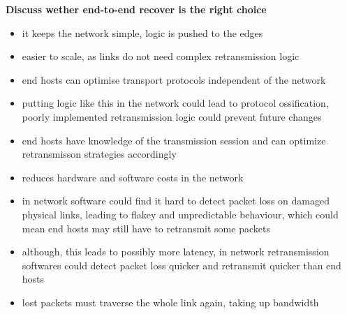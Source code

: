 \documentclass{article}
\begin{document}
\textbf{Discuss wether end-to-end recover is the right choice}
\begin{itemize}
    \item it keeps the network simple, logic is pushed to the edges
    \item easier to scale, as links do not need complex retransmission logic
    \item end hosts can optimise transport protocols independent of the network
    \item putting logic like this in the network could lead to protocol ossification, poorly implemented retransmission logic could prevent future changes
    \item end hosts have knowledge of the transmission session and can optimize retransmisson strategies accordingly
    \item reduces hardware and software costs in the network
    \item in network software could find it hard to detect packet loss on damaged physical links, leading to flakey and unpredictable behaviour, which could mean end hosts may still have to retransmit some packets
    \item although, this leads to possibly more latency, in network retransmission softwares could detect packet loss quicker and retransmit quicker than end hosts
    \item lost packets must traverse the whole link again, taking up bandwidth
\end{itemize}
\end{document}

